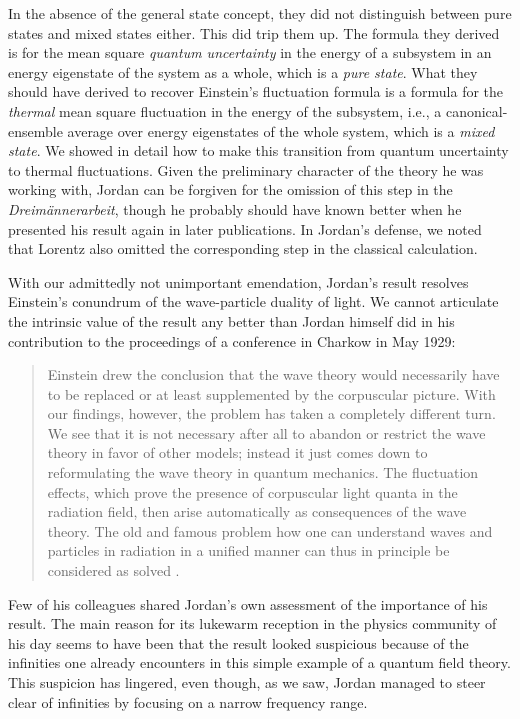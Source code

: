 \documentclass[12pt]{elsart}
\begin{document}
{In the absence of the general state concept, they did not distinguish between pure states and mixed states either. This did trip them up. The formula they derived is for the mean square {\it quantum uncertainty} in the energy of a subsystem in an energy eigenstate of the system as a whole, which is a {\it pure state}. 
What they should have derived to recover Einstein's fluctuation formula is a formula for the {\it thermal} mean square fluctuation in the energy of the subsystem, i.e., a canonical-ensemble average over energy eigenstates of the whole system, which is a {\it mixed state}. We showed in detail how to make this transition from quantum uncertainty to thermal fluctuations. Given the preliminary character of the theory he was working with, Jordan can be forgiven for the omission of this step in the {\it Dreim\"annerarbeit}, though he probably should have known better when he presented his result again in later publications. In Jordan's defense,  we noted that Lorentz also omitted the corresponding step in the classical calculation.

With our admittedly not unimportant emendation, Jordan's result resolves Einstein's conundrum of the wave-particle duality of light. We cannot articulate the intrinsic value of the result any better than Jordan himself did in his contribution to the proceedings of a conference in Charkow in May 1929:
\begin{quotation}
Einstein drew the conclusion that the wave theory would necessarily have to be replaced or at least supplemented by the corpuscular picture. With our findings, however, the problem has taken a completely different turn. We see that it is not necessary after all to abandon or restrict the wave theory in favor of other models; instead it just comes down to reformulating the wave theory in quantum mechanics. The fluctuation effects, which prove the presence of corpuscular light quanta in the radiation field, then arise automatically as consequences of the wave theory.  The old and famous problem how one can understand waves and particles in radiation in a unified manner can thus in principle be considered as solved \citep[p.\ 702]{Jordan 1929}. 
\end{quotation}
Few of his colleagues shared Jordan's own assessment of the importance of his result. The main reason for its lukewarm reception in the physics community of his day seems to have been that the result looked suspicious because of the infinities one already encounters in this simple example of a quantum field theory. This suspicion has lingered, even though, as we saw, Jordan managed to steer clear of infinities by focusing on a narrow frequency range. 

}
\end{document}
